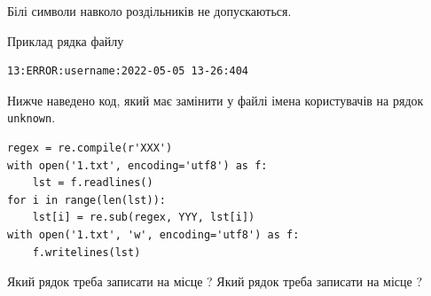\documentclass[12pt, ukrainian]{article}
\def\code#1{\Verb!#1!}
\begin{document}
{Білі символи навколо роздільників не допускаються.

Приклад рядка файлу



\begin{verbatim}
13:ERROR:username:2022-05-05 13-26:404
\end{verbatim}


Нижче наведено код, який має замінити у файлі імена користувачів на рядок \code{unknown}.



\begin{verbatim}
regex = re.compile(r'XXX')
with open('1.txt', encoding='utf8') as f:
    lst = f.readlines()
for i in range(len(lst)):
    lst[i] = re.sub(regex, YYY, lst[i])
with open('1.txt', 'w', encoding='utf8') as f:
    f.writelines(lst)
\end{verbatim}





Який рядок треба записати на місце  ?
Який рядок треба записати на місце  ?\par

}
\end{document}

